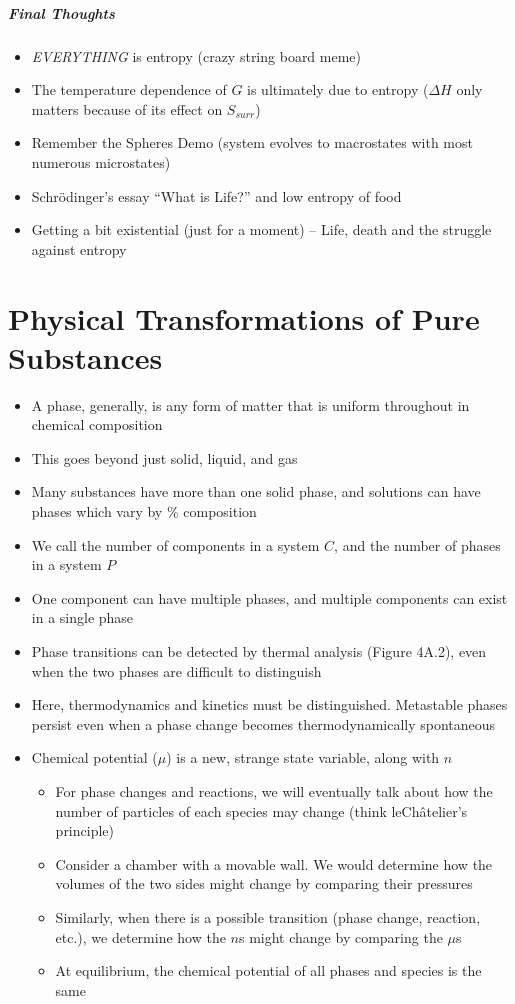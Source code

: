 \documentclass[12pt, openany, letterpaper]{memoir}
\begin{document}
\paragraph{Final Thoughts}
\begin{itemize}
  \item \emph{EVERYTHING} is entropy (crazy string board meme)
  \item The temperature dependence of $G$ is ultimately due to entropy ($\Delta H$ only matters because of its effect on $S_{surr}$)
  \item Remember the Spheres Demo (system evolves to macrostates with most numerous microstates)
  \item Schr\"odinger's essay ``What is Life?'' and low entropy of food
  \item Getting a bit existential (just for a moment) -- Life, death and the struggle against entropy
\end{itemize}

\chapter{Physical Transformations of Pure Substances}
\begin{itemize}
	\item A phase, generally, is any form of matter that is uniform throughout in chemical composition
	\item This goes beyond just solid, liquid, and gas
	\item Many substances have more than one solid phase, and solutions can have phases which vary by \% composition
	\item We call the number of components in a system $C$, and the number of phases in a system $P$
	\item One component can have multiple phases, and multiple components can exist in a single phase
	\item Phase transitions can be detected by thermal analysis (Figure 4A.2), even when the two phases are difficult to distinguish
	\item Here, thermodynamics and kinetics must be distinguished. Metastable phases persist even when a phase change becomes thermodynamically spontaneous
	\item Chemical potential ($\mu$) is a new, strange state variable, along with $n$
	      \begin{itemize}
		      \item For phase changes and reactions, we will eventually talk about how the number of particles of each species may change (think leCh\^{a}telier's principle)
		      \item Consider a chamber with a movable wall. We would determine how the volumes of the two sides might change by comparing their pressures
		      \item Similarly, when there is a possible transition (phase change, reaction, etc.), we determine how the $n$s might change by comparing the $\mu$s
		      \item At equilibrium, the chemical potential of all phases and species is the same
	      \end{itemize}
\end{itemize}
\end{document}
